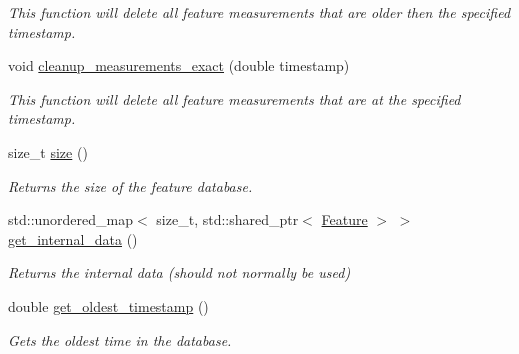 \begin{DoxyCompactItemize}
\begin{DoxyCompactList}\small\item\em This function will delete all feature measurements that are older then the specified timestamp. \end{DoxyCompactList}\item 
\mbox{\label{classov__core_1_1FeatureDatabase_a08484576099480a2fd0b0cc9630c12b6}} 
void \hyperlink{classov__core_1_1FeatureDatabase_a08484576099480a2fd0b0cc9630c12b6}{cleanup\+\_\+measurements\+\_\+exact} (double timestamp)
\begin{DoxyCompactList}\small\item\em This function will delete all feature measurements that are at the specified timestamp. \end{DoxyCompactList}\item 
\mbox{\label{classov__core_1_1FeatureDatabase_ab9b243f8a439794e454bfb604061cb4a}} 
size\+\_\+t \hyperlink{classov__core_1_1FeatureDatabase_ab9b243f8a439794e454bfb604061cb4a}{size} ()
\begin{DoxyCompactList}\small\item\em Returns the size of the feature database. \end{DoxyCompactList}\item 
\mbox{\label{classov__core_1_1FeatureDatabase_ad105b5cacc83eae1a5fb71f05b084294}} 
std\+::unordered\+\_\+map$<$ size\+\_\+t, std\+::shared\+\_\+ptr$<$ \hyperlink{classov__core_1_1Feature}{Feature} $>$ $>$ \hyperlink{classov__core_1_1FeatureDatabase_ad105b5cacc83eae1a5fb71f05b084294}{get\+\_\+internal\+\_\+data} ()
\begin{DoxyCompactList}\small\item\em Returns the internal data (should not normally be used) \end{DoxyCompactList}\item 
\mbox{\label{classov__core_1_1FeatureDatabase_a890b5a9095ebe2a6adbe208865170274}} 
double \hyperlink{classov__core_1_1FeatureDatabase_a890b5a9095ebe2a6adbe208865170274}{get\+\_\+oldest\+\_\+timestamp} ()
\begin{DoxyCompactList}\small\item\em Gets the oldest time in the database. \end{DoxyCompactList}\item 

\end{DoxyCompactItemize}
